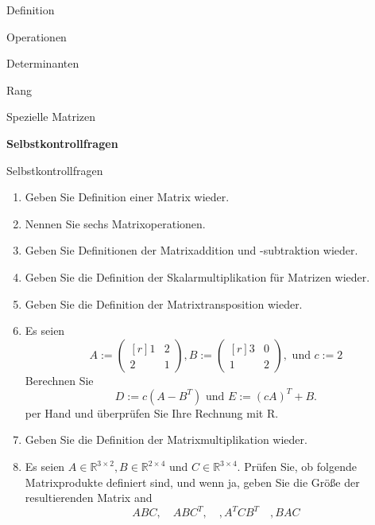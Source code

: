 \documentclass[
  8pt,
  ignorenonframetext,
]{beamer}
\begin{document}
\begin{frame}{}
\protect\hypertarget{section-8}{}
\large
{}
\vfill

Definition

Operationen

Determinanten

Rang

Spezielle Matrizen

\textbf{Selbstkontrollfragen}

\vfill
\end{frame}

\begin{frame}{Selbstkontrollfragen}
\protect\hypertarget{selbstkontrollfragen}{}
\footnotesize
\begin{enumerate}
\item Geben Sie Definition einer Matrix wieder.
\item Nennen Sie sechs Matrixoperationen.
\item Geben Sie Definitionen der Matrixaddition und -subtraktion wieder.
\item Geben Sie die Definition der Skalarmultiplikation für Matrizen wieder.
\item Geben Sie die Definition der Matrixtransposition wieder.
\item Es seien
\begin{equation}
A :=
\begin{pmatrix*}[r]
1 & 2 \\
2 & 1
\end{pmatrix*},
B :=
\begin{pmatrix*}[r]
3 & 0 \\
1 & 2
\end{pmatrix*},
\mbox{ und }
c := 2
\end{equation}
Berechnen Sie
\begin{equation}
D := c\left(A - B^T\right)
\mbox{ und }
E := \left(cA\right)^T + B.
\end{equation}
per Hand und überprüfen Sie Ihre Rechnung mit R.


\item Geben Sie die Definition der Matrixmultiplikation wieder.
\item Es seien $A \in \mathbb{R}^{3 \times 2}, B \in \mathbb{R}^{2\times 4}$
und $C \in \mathbb{R}^{3 \times 4}$. Prüfen Sie, ob folgende Matrixprodukte
definiert sind, und wenn ja, geben Sie die Größe der resultierenden Matrix and
\begin{equation}
ABC, \quad ABC^T, \quad, A^TCB^T \quad, BAC
\end{equation}

\end{enumerate}
\end{frame}
\end{document}
